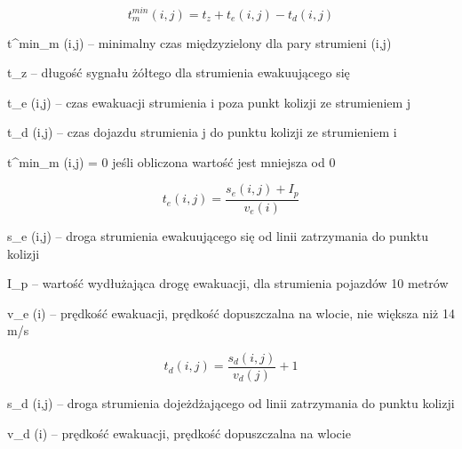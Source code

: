 \begin{equation}
	t^{min}_{m} (i,j) = t_{z} + t_{e} (i,j) - t_{d} (i,j)
\end{equation}

t^{min}_{m} (i,j) \textrm{ -- minimalny czas międzyzielony dla pary strumieni (i,j)}

t_{z} \textrm{ -- długość sygnału żółtego dla strumienia ewakuującego się}

t_{e} (i,j) \textrm{ -- czas ewakuacji strumienia i poza punkt kolizji ze strumieniem j}

t_{d} (i,j) \textrm{ -- czas dojazdu strumienia j do punktu kolizji ze strumieniem i}

t^{min}_{m} (i,j) = 0 \textrm{ jeśli obliczona wartość jest mniejsza od 0}

\begin{equation}
	t_{e} (i,j) = \frac{s_{e} (i,j) + I_p}{v_{e} (i)}
\end{equation}

s_{e} (i,j) \textrm{ -- droga strumienia ewakuującego się od linii zatrzymania do punktu kolizji}

I_p \textrm{ -- wartość wydłużająca drogę ewakuacji, dla strumienia pojazdów 10 metrów}

v_{e} (i) \textrm{ -- prędkość ewakuacji, prędkość dopuszczalna na wlocie, nie większa niż 14 m/s}

\begin{equation}
	t_{d} (i,j) = \frac{s_{d} (i,j)}{v_{d} (j)} + 1
\end{equation}

s_{d} (i,j) \textrm{ -- droga strumienia dojeżdżającego od linii zatrzymania do punktu kolizji}

v_{d} (i) \textrm{ -- prędkość ewakuacji, prędkość dopuszczalna na wlocie}